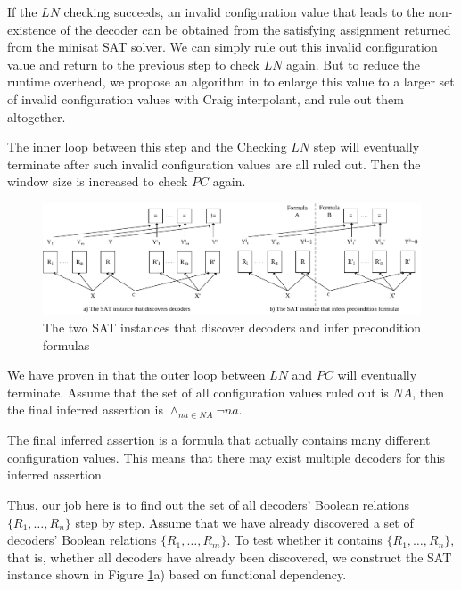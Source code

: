 \documentclass[runningheads,a4paper]{llncs}
\begin{document}
\vspace{0.2cm}
\vspace{0.2cm}

If the $LN$ checking succeeds,
an invalid configuration value that leads to the non-existence of the decoder can be obtained from the satisfying assignment returned from the minisat SAT solver\cite{EXTSAT}.
We can simply rule out this invalid configuration value and return to the previous step to check $LN$ again.
But to reduce the runtime overhead,
we propose an algorithm in \cite{ShengYuShen:iccad11} to enlarge this value to a larger set of invalid configuration values with Craig interpolant\cite{Craig},
and rule out them altogether.

The inner loop between this step and the Checking $LN$ step will eventually terminate after such invalid configuration values are all ruled out.
Then the window size is increased to check $PC$ again.

\begin{figure}[b]
\centering
\includegraphics[width=\textwidth]{fdtest_all}
\caption{The two SAT instances that discover decoders and infer precondition formulas}
\label{fig_fdtest}
\end{figure}

We have proven in \cite{ShengYuShen:iccad11} that the outer loop between $LN$ and $PC$ will eventually terminate.
Assume that the set of all configuration values ruled out is $NA$,
then the final inferred assertion is $\wedge_{na\in NA}\neg na$.

\vspace{0.2cm}
\vspace{0.2cm}

The final inferred assertion is a formula that actually contains many different configuration values.
This means that there may exist multiple decoders for this inferred assertion.

Thus,
our job here is to find out the set of all decoders' Boolean relations $\{R_1,\dots,R_n\}$ step by step.
Assume that we have already discovered a set of decoders' Boolean relations $\{R_1,\dots,R_{m}\}$.
To test whether it contains $\{R_1,\dots,R_n\}$,
that is,
whether all decoders have already been discovered,
we construct the SAT instance shown in Figure \ref{fig_fdtest}a) based on functional dependency\cite{funcdep}.
\end{document}
